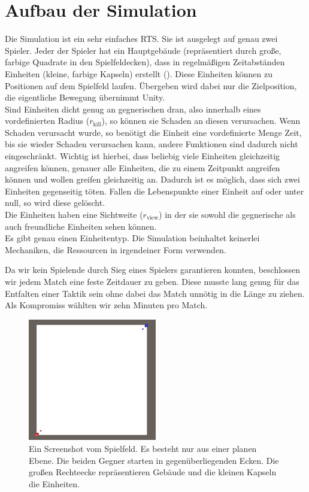 \documentclass[
	12pt,
	a4paper,
	BCOR10mm,
	DIV14,
	headsepline,
	usegeometry,
]{scrreprt}
\begin{document}
\section{Aufbau der Simulation}
Die Simulation ist ein sehr einfaches RTS. 
Sie ist ausgelegt auf genau zwei Spieler. 
Jeder der Spieler hat ein Hauptgebäude (repräsentiert durch große, farbige Quadrate in den Spielfeldecken), dass in regelmäßigen Zeitabständen Einheiten (kleine, farbige Kapseln) erstellt (). 
Diese Einheiten können zu Positionen auf dem Spielfeld laufen. Übergeben wird dabei nur die Zielposition, die eigentliche Bewegung übernimmt Unity.\\
Sind Einheiten dicht genug an gegnerischen dran, also innerhalb eines vordefinierten Radius ($r_{\text{kill}}$), so können sie Schaden an diesen verursachen. Wenn Schaden verursacht wurde, so benötigt die Einheit eine vordefinierte Menge Zeit, bis sie wieder Schaden verursachen kann, andere Funktionen sind dadurch nicht eingeschränkt. Wichtig ist hierbei, dass beliebig viele Einheiten gleichzeitig angreifen können, genauer alle Einheiten, die zu einem Zeitpunkt angreifen können und wollen greifen gleichzeitig an. Dadurch ist es möglich, dass sich zwei Einheiten gegenseitig töten.
Fallen die Lebenspunkte einer Einheit auf oder unter null, so wird diese gelöscht.\\
Die Einheiten haben eine Sichtweite ($r_{\text{view}}$) in der sie sowohl die gegnerische als auch freundliche Einheiten sehen können.\\
Es gibt genau einen Einheitentyp. Die Simulation beinhaltet keinerlei Mechaniken, die Ressourcen in irgendeiner Form verwenden.

Da wir kein Spielende durch Sieg eines Spielers garantieren konnten, beschlossen wir jedem Match eine feste Zeitdauer zu geben. Diese musste lang genug für das Entfalten einer Taktik sein ohne dabei das Match unnötig in die Länge zu ziehen. Als Kompromiss wählten wir zehn Minuten pro Match.

\begin{figure}[h]
	\centering
	\includegraphics[width = 0.5\textwidth]{Spielfeld.png}
	\caption{Ein Screenshot vom Spielfeld. Es besteht nur aus einer planen Ebene. Die beiden Gegner starten in gegenüberliegenden Ecken. Die großen Rechteecke repräsentieren Gebäude und die kleinen Kapseln die Einheiten.}
	\label{Spielfeld}
\end{figure}
\end{document}
